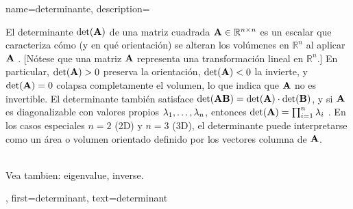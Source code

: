 {name={determinante},
 description={El determinante $\det({\bf A})$ de una matriz cuadrada 
 ${\bf A} \in \mathbb{R}^{n \times n}$ es un escalar que caracteriza cómo (y en qué orientación) 
 se alteran los volúmenes en $\mathbb{R}^n$ al aplicar ${\bf A}$ \cite{GolubVanLoanBook,Strang2007}. 
 [Nótese que una matriz ${\bf A}$ representa una transformación lineal en $\mathbb{R}^{n}$.] 
 En particular, $\det({\bf A}) > 0$ preserva la orientación, $\det({\bf A}) < 0$ la invierte, 
 y $\det({\bf A}) = 0$ colapsa completamente el volumen, lo que indica que ${\bf A}$ no es invertible. 
 El determinante también satisface $\det({\bf A} {\bf B}) = \det({\bf A}) \cdot \det({\bf B})$, y si ${\bf A}$ 
 es diagonalizable con valores propios $\lambda_{1}, \ldots, \lambda_{n}$, entonces 
 $\det({\bf A}) = \prod_{i=1}^{n} \lambda_{i}$ \cite{HornMatAnalysis}.
 En los casos especiales $n=2$ (2D) y $n=3$ (3D), el determinante puede interpretarse como un área 
 o volumen orientado definido por los vectores columna de ${\bf A}$.
    \begin{figure} 
    	\begin{center}
	\end{center}
	\end{figure}
		\\ 
		Vea tambien: \gls{eigenvalue}, \gls{inverse}.
	},
	first={determinant},
	text={determinant}
}

